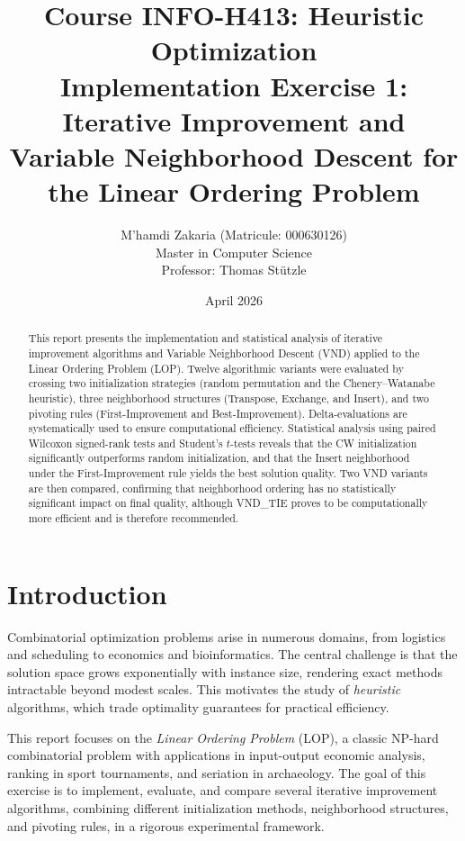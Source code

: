 \documentclass[11pt, a4paper]{article}
\title{\textbf{Course INFO-H413: Heuristic Optimization}\\[0.4em]
\large Implementation Exercise 1: Iterative Improvement and\\
Variable Neighborhood Descent for the Linear Ordering Problem}
\author{M'hamdi Zakaria (Matricule: 000630126)\\
Master in Computer Science\\[0.3em]
\small Professor: Thomas St\"{u}tzle}
\date{April 2026}
\begin{document}
\maketitle

\begin{abstract}
This report presents the implementation and statistical analysis of iterative improvement algorithms and Variable Neighborhood Descent (VND) applied to the Linear Ordering Problem (LOP). Twelve algorithmic variants were evaluated by crossing two initialization strategies (random permutation and the Chenery--Watanabe heuristic), three neighborhood structures (Transpose, Exchange, and Insert), and two pivoting rules (First-Improvement and Best-Improvement). Delta-evaluations are systematically used to ensure computational efficiency. Statistical analysis using paired Wilcoxon signed-rank tests and Student's $t$-tests reveals that the CW initialization significantly outperforms random initialization, and that the Insert neighborhood under the First-Improvement rule yields the best solution quality. Two VND variants are then compared, confirming that neighborhood ordering has no statistically significant impact on final quality, although VND\_TIE proves to be computationally more efficient and is therefore recommended.
\end{abstract}

\tableofcontents
\newpage

\section{Introduction}

Combinatorial optimization problems arise in numerous domains, from logistics and scheduling to economics and bioinformatics. The central challenge is that the solution space grows exponentially with instance size, rendering exact methods intractable beyond modest scales. This motivates the study of \textit{heuristic} algorithms, which trade optimality guarantees for practical efficiency.

This report focuses on the \textit{Linear Ordering Problem} (LOP), a classic NP-hard combinatorial problem with applications in input-output economic analysis, ranking in sport tournaments, and seriation in archaeology. The goal of this exercise is to implement, evaluate, and compare several iterative improvement algorithms, combining different initialization methods, neighborhood structures, and pivoting rules, in a rigorous experimental framework.
\end{document}

